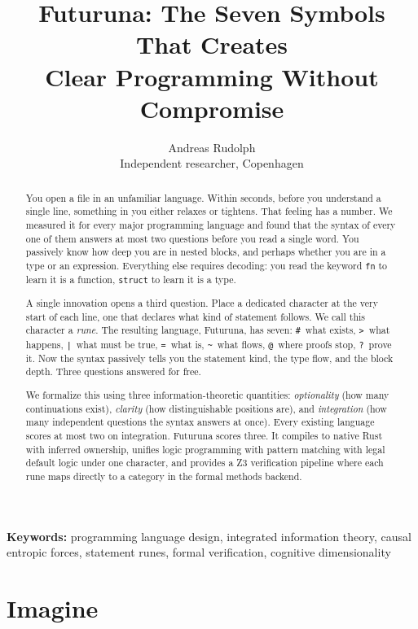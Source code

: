 \documentclass[11pt,a4paper]{article}
\title{\textbf{Futuruna: The Seven Symbols That Creates\\Clear Programming Without Compromise}}
\author{Andreas Rudolph\\Independent researcher, Copenhagen}
\date{}
\begin{document}
\maketitle

\begin{abstract}
You open a file in an unfamiliar language. Within seconds, before you understand a single line, something in you either relaxes or tightens. That feeling has a number. We measured it for every major programming language and found that the syntax of every one of them answers at most two questions before you read a single word. You passively know how deep you are in nested blocks, and perhaps whether you are in a type or an expression. Everything else requires decoding: you read the keyword \texttt{fn} to learn it is a function, \texttt{struct} to learn it is a type.

A single innovation opens a third question. Place a dedicated character at the very start of each line, one that declares what kind of statement follows. We call this character a \emph{rune}. The resulting language, Futuruna, has seven: \texttt{\#}~what exists, \texttt{>}~what happens, \texttt{|}~what must be true, \texttt{=}~what is, \texttt{\textasciitilde}~what flows, \texttt{@}~where proofs stop, \texttt{?}~prove it. Now the syntax passively tells you the statement kind, the type flow, and the block depth. Three questions answered for free.

We formalize this using three information-theoretic quantities: \emph{optionality} (how many continuations exist), \emph{clarity} (how distinguishable positions are), and \emph{integration} (how many independent questions the syntax answers at once). Every existing language scores at most two on integration. Futuruna scores three. It compiles to native Rust with inferred ownership, unifies logic programming with pattern matching with legal default logic under one character, and provides a Z3 verification pipeline where each rune maps directly to a category in the formal methods backend.
\end{abstract}

\medskip
\noindent\textbf{Keywords:} programming language design, integrated information theory, causal entropic forces, statement runes, formal verification, cognitive dimensionality

\section{Imagine}
\end{document}
